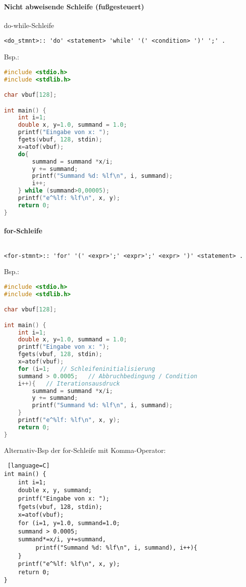 \paragraph{Nicht abweisende Schleife (fußgesteuert)} do-while-Schleife
\begin{lstlisting}
<do_stmnt>:: 'do' <statement> 'while' '(' <condition> ')' ';' .
\end{lstlisting}

Bsp.:
\begin{lstlisting}[language=C]
#include <stdio.h>
#include <stdlib.h>

char vbuf[128];

int main() {
	int i=1;
	double x, y=1.0, summand = 1.0;
	printf("Eingabe von x: ");
	fgets(vbuf, 128, stdin);
	x=atof(vbuf);
	do{
		summand = summand *x/i;
		y += summand;
		printf("Summand %d: %lf\n", i, summand);
		i++;
	} while (summand>0,00005);
	printf("e^%lf: %lf\n", x, y);
	return 0;
}
\end{lstlisting}

\paragraph{for-Schleife} $ $
\begin{lstlisting}
<for-stmnt>:: 'for' '(' <expr>';' <expr>';' <expr> ')' <statement> .
\end{lstlisting}

Bsp.:
\begin{lstlisting}[language=C]
#include <stdio.h>
#include <stdlib.h>

char vbuf[128];

int main() {
	int i=1;
	double x, y=1.0, summand = 1.0;
	printf("Eingabe von x: ");
	fgets(vbuf, 128, stdin);
	x=atof(vbuf);
	for (i=1; 	// Schleifeninitialisierung
	summand > 0.0005; 	// Abbruchbedingung / Condition
	i++){	// Iterationsausdruck
		summand = summand *x/i;
		y += summand;
		printf("Summand %d: %lf\n", i, summand);
	}
	printf("e^%lf: %lf\n", x, y);
	return 0;
}
\end{lstlisting}

Alternativ-Bsp der for-Schleife mit Komma-Operator:
\begin{lstlisting} [language=C]
int main() {
	int i=1;
	double x, y, summand;
	printf("Eingabe von x: ");
	fgets(vbuf, 128, stdin);
	x=atof(vbuf);
	for (i=1, y=1.0, summand=1.0;
	summand > 0.0005;
	summand*=x/i, y+=summand,
		 printf("Summand %d: %lf\n", i, summand), i++){
	}
	printf("e^%lf: %lf\n", x, y);
	return 0;
}
\end{lstlisting}

